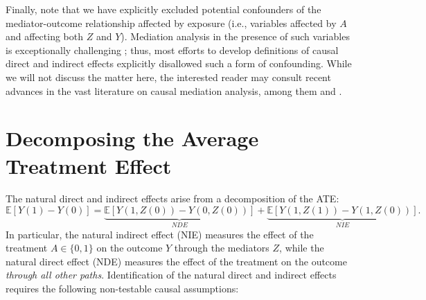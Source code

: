 \documentclass[12pt, krantz2,]{krantz}
\theoremstyle{definition}
\theoremstyle{definition}
\theoremstyle{definition}
\newcommand{\E}{\mathbb{E}}
\newcommand{\1}{\mathbbm{1}}
\begin{document}
Finally, note that we have explicitly excluded potential confounders of the
mediator-outcome relationship affected by exposure (i.e., variables affected by
\(A\) and affecting both \(Z\) and \(Y\)). Mediation analysis in the presence of such
variables is exceptionally challenging \citep{avin2005identifiability}; thus, most
efforts to develop definitions of causal direct and indirect effects explicitly
disallowed such a form of confounding. While we will not discuss the matter
here, the interested reader may consult recent advances in the vast literature
on causal mediation analysis, among them \citet{diaz2020nonparametric} and
\citet{hejazi2021nonparametric}.

\hypertarget{decomposing-the-average-treatment-effect}{%
\section{Decomposing the Average Treatment Effect}\label{decomposing-the-average-treatment-effect}}

The natural direct and indirect effects arise from a decomposition of the ATE:
\begin{equation*}
  \E[Y(1) - Y(0)] =
    \underbrace{\E[Y(1, Z(0)) - Y(0, Z(0))]}_{NDE} +
    \underbrace{\E[Y(1, Z(1)) - Y(1, Z(0))]}_{NIE}.
\end{equation*}
In particular, the natural indirect effect (NIE) measures the effect of the
treatment \(A \in \{0, 1\}\) on the outcome \(Y\) through the mediators \(Z\), while
the natural direct effect (NDE) measures the effect of the treatment on the
outcome \emph{through all other paths}. Identification of the natural direct and
indirect effects requires the following non-testable causal assumptions:
\end{document}
